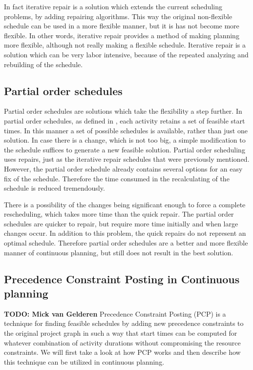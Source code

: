 \documentclass{article}
\newcommand{\TODO}[1]{{\color{red}\textbf{TODO: #1}}}
\begin{document}
In fact iterative repair is a solution which extends the current scheduling problems, by adding repairing algorithms.
This way the original non-flexible schedule can be used in a more flexible manner, but it is has not become more flexible.
In other words, iterative repair provides a method of making planning more flexible, although not really making a flexible schedule.
Iterative repair is a solution which can be very labor intensive, because of the repeated analyzing and rebuilding of the schedule.

\subsection{Partial order schedules}
Partial order schedules are solutions which take the flexibility a step further.
In partial order schedules, as defined in \cite{policella07}, each activity retains a set of feasible start times.
In this manner a set of possible schedules is available, rather than just one solution.
In case there is a change, which is not too big, a simple modification to the schedule suffices to generate a new feasible solution.
Partial order scheduling uses repairs, just as the iterative repair schedules that were previously mentioned.
However, the partial order schedule already contains several options for an easy fix of the schedule.
Therefore the time consumed in the recalculating of the schedule is reduced tremendously.

There is a possibility of the changes being significant enough to force a complete rescheduling, which takes more time than the quick repair.
The partial order schedules are quicker to repair, but require more time initially and when large changes occur.
In addition to this problem, the quick repairs do not represent an optimal schedule.
Therefore partial order schedules are a better and more flexible manner of continuous planning, but still does not result in the best solution. 


\subsection{Precedence Constraint Posting in Continuous planning}
\TODO{Mick van Gelderen}
Precedence Constraint Posting (PCP) is a technique for finding feasible schedules by adding new precedence constraints to the original project graph in such a way that start times can be computed for whatever combination of activity durations without compromising the resource constraints. We will first take a look at how PCP works and then describe how this technique can be utilized in continuous planning. 
\end{document}

